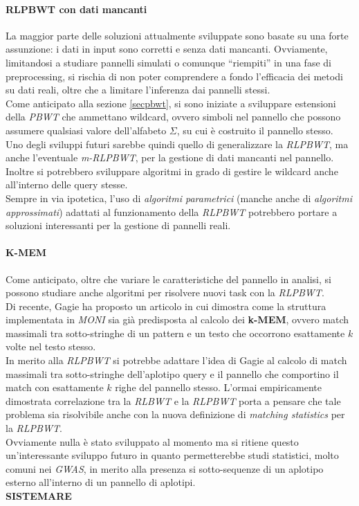 \paragraph{RLPBWT con dati mancanti}
La maggior parte delle soluzioni attualmente sviluppate sono basate su una forte
assunzione: i dati in input sono corretti e senza dati mancanti. Ovviamente,
limitandosi a studiare pannelli simulati o comunque ``riempiti'' in una fase di
preprocessing, si rischia di non poter comprendere a fondo l'efficacia dei
metodi su dati reali, oltre che a limitare l'inferenza dai pannelli stessi.\\
Come anticipato alla sezione \ref{secpbwt}, si sono iniziate a sviluppare
estensioni della \textit{PBWT} che ammettano wildcard, ovvero simboli nel
pannello che possono assumere qualsiasi valore dell'alfabeto $\Sigma$, su cui è
costruito il pannello stesso.\\
Uno degli sviluppi futuri sarebbe quindi quello di generalizzare la
\textit{RLPBWT}, ma anche l'eventuale \textit{m-RLPBWT}, per la gestione di dati
mancanti nel pannello. Inoltre si potrebbero sviluppare algoritmi in grado di
gestire le wildcard anche all'interno delle query stesse.\\
Sempre in via ipotetica, l'uso di \textit{algoritmi parametrici} (manche anche
di \textit{algoritmi approssimati}) adattati al
funzionamento della \textit{RLPBWT} potrebbero portare a soluzioni interessanti
per la gestione di pannelli reali.
\paragraph{K-MEM}
Come anticipato, oltre che variare le caratteristiche del pannello in analisi,
si possono studiare anche algoritmi per risolvere nuovi task con la
\textit{RLPBWT}.\\ 
Di recente, Gagie \cite{kmems} ha proposto un articolo in cui dimostra come
la struttura implementata in \textit{MONI} \cite{moni} sia già predisposta al
calcolo dei \textbf{k-MEM}, ovvero match massimali tra sotto-stringhe di un
pattern e un testo che occorrono esattamente $k$ volte nel testo stesso.\\
In merito alla \textit{RLPBWT} si potrebbe adattare l'idea di Gagie al calcolo
di match massimali tra sotto-stringhe dell'aplotipo query e il pannello che
comportino il match con esattamente $k$ righe del pannello stesso. L'ormai
empiricamente dimostrata correlazione tra la \textit{RLBWT} e la \textit{RLPBWT}
porta a pensare che tale problema sia risolvibile anche con la nuova definizione
di \textit{matching statistics} per la \textit{RLPBWT}.\\
Ovviamente nulla è stato sviluppato al momento ma si ritiene questo
un'interessante sviluppo futuro in quanto permetterebbe studi statistici, molto
comuni nei \textit{GWAS}, in merito alla presenza si sotto-sequenze di un
aplotipo esterno all'interno di un pannello di aplotipi.\\
\textbf{SISTEMARE}
